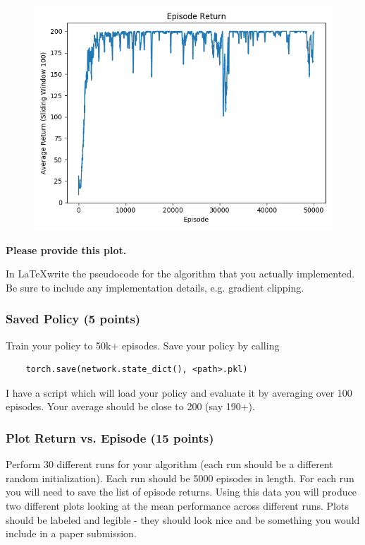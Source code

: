 \documentclass{article}
\begin{document}
\begin{figure}[h]
\begin{center}
\centerline{\includegraphics[height=\imgheight]{img/return.png}}
\end{center}
\end{figure}

\textbf{Please provide this plot.}

In \LaTeX write the pseudocode for the algorithm that you actually implemented. Be sure to include any implementation details, e.g. gradient clipping.

\subsubsection{Saved Policy (5 points)}

Train your policy to 50k+ episodes. Save your policy by calling 
\begin{verbatim}
    torch.save(network.state_dict(), <path>.pkl)
\end{verbatim}

I have a script which will load your policy and evaluate it by averaging over 100 episodes. Your average should be close to 200 (say 190+).

\subsubsection{Plot Return vs. Episode (15 points)}

Perform 30 different runs for your algorithm (each run should be a different random initialization). Each run should be 5000 episodes in length. For each run you will need to save the list of episode returns. Using this data you will produce two different plots looking at the mean performance across different runs. Plots should be labeled and legible - they should look nice and be something you would include in a paper submission.
\end{document}
